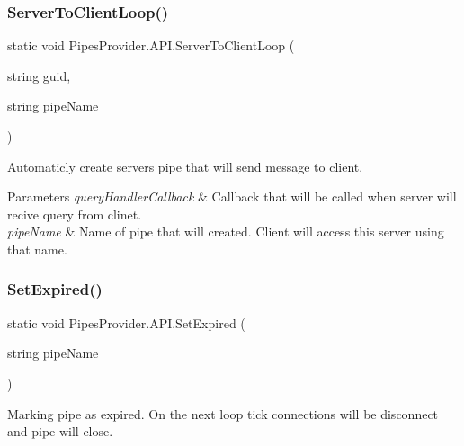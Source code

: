 \subsubsection{\texorpdfstring{Server\+To\+Client\+Loop()}{ServerToClientLoop()}\hspace{0.1cm}{\footnotesize\ttfamily [2/2]}}
{\footnotesize\ttfamily static void Pipes\+Provider.\+A\+P\+I.\+Server\+To\+Client\+Loop (\begin{DoxyParamCaption}\item[{string}]{guid,  }\item[{string}]{pipe\+Name }\end{DoxyParamCaption})\hspace{0.3cm}{\ttfamily [static]}}



Automaticly create server\textquotesingle{}s pipe that will send message to client. 


\begin{DoxyParams}{Parameters}
{\em query\+Handler\+Callback} & Callback that will be called when server will recive query from clinet.\\
\hline
{\em pipe\+Name} & Name of pipe that will created. Client will access this server using that name.\\
\hline
\end{DoxyParams}
\mbox{\label{class_pipes_provider_1_1_a_p_i_ab525aaa0c87f23cfbe4ad6d0ed1b1b4c}} 
\subsubsection{\texorpdfstring{Set\+Expired()}{SetExpired()}\hspace{0.1cm}{\footnotesize\ttfamily [1/2]}}
{\footnotesize\ttfamily static void Pipes\+Provider.\+A\+P\+I.\+Set\+Expired (\begin{DoxyParamCaption}\item[{string}]{pipe\+Name }\end{DoxyParamCaption})\hspace{0.3cm}{\ttfamily [static]}}



Marking pipe as expired. On the next loop tick connections will be disconnect and pipe will close. 


